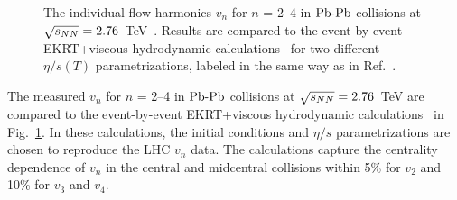 \begin{figure}[h]
\begin{center}
        \caption{The individual flow harmonics $v_n$ for $n$ = 2--4 in $\textnormal{Pb-Pb}$ collisions at $\sqrt{s_{NN}}=2.76$~TeV~\cite{Adam:2016izf}. Results are compared to the event-by-event EKRT+viscous hydrodynamic calculations~\cite{Niemi:2015qia} for two different $\eta/s(T)$ parametrizations, labeled in the same way as in Ref.~\cite{Niemi:2015qia}.}
        \label{fig:Figure_A1}
              \end{center}
\end{figure}

The measured $v_n$ for $n$ = 2--4 in $\textnormal{Pb-Pb}$ collisions at $\sqrt{s_{NN}}=2.76$~TeV are compared to the event-by-event EKRT+viscous hydrodynamic calculations~\cite{Niemi:2015qia} in Fig.~\ref{fig:Figure_A1}. In these calculations, the initial conditions and $\eta/s$ parametrizations are chosen to reproduce the LHC $v_n$ data.
The calculations capture the centrality dependence of $v_n$ in the central and midcentral collisions within 5\% for $v_2$ and 10\% for $v_3$ and $v_4$.

